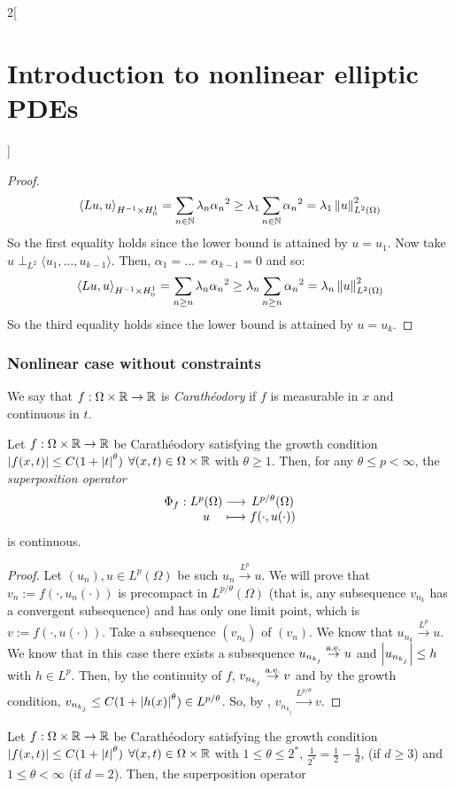 \documentclass[../../../main_math.tex]{subfiles}
\begin{document}
\begin{multicols}{2}[\section{Introduction to nonlinear elliptic PDEs}]
\begin{proof}
    $$
      {\langle Lu,u\rangle}_{H^{-1}\times H_0^1}= \sum_{n\in\mathbb{N}}\lambda_n{\alpha_n}^2\geq \lambda_1\sum_{n\in\mathbb{N}}{\alpha_n}^2=\lambda_1\left\|u\right\|_{L^2(\Omega)}^2
    $$
    So the first equality holds since the lower bound is attained by $u=u_1$. Now take $u\perp_{L^2}\langle u_1,\dots,u_{k-1}\rangle$. Then, $\alpha_1=\dots=\alpha_{k-1}=0$ and so:
    $$
      {\langle Lu,u\rangle}_{H^{-1}\times H_0^1}= \sum_{n\geq n}\lambda_n{\alpha_n}^2\geq \lambda_n\sum_{n\geq n}{\alpha_n}^2=\lambda_n\left\|u\right\|_{L^2(\Omega)}^2
    $$
    So the third equality holds since the lower bound is attained by $u=u_k$.
  \end{proof}
  \subsubsection{Nonlinear case without constraints}
  \begin{definition}
    We say that $f:\Omega\times \mathbb{R}\to\mathbb{R}$ is \emph{Carathéodory} if $f$ is measurable in $x$ and continuous in $t$.
  \end{definition}
  \begin{theorem}
    Let $f:\Omega\times \mathbb{R}\to\mathbb{R}$ be Carathéodory satisfying the growth condition $\abs{f(x,t)}\leq C(1+\abs{t}^\theta)$ $\forall (x,t)\in \Omega\times \mathbb{R}$ with $\theta\geq 1$. Then, for any $\theta\leq p<\infty$, the \emph{superposition operator}
    $$
      \function{\Phi_f}{L^p(\Omega)}{L^{p/\theta}(\Omega)}{u}{f(\cdot,u(\cdot))}
    $$
    is continuous.
  \end{theorem}
  \begin{proof}
    Let $(u_n),u\in L^p(\Omega)$ be such $u_n\overset{L^p}{\longrightarrow} u$. We will prove that $v_n:=f(\cdot,u_n(\cdot))$ is precompact in $L^{p/\theta}(\Omega)$ (that is, any subsequence $v_{n_k}$ has a convergent subsequence) and has only one limit point, which is $v:=f(\cdot,u(\cdot))$. Take a subsequence $(v_{n_k})$ of $(v_n)$. We know that $u_{n_k}\overset{L^p}{\longrightarrow} u$. We know that in this case there exists a subsequence $u_{n_{k_j}}\overset{\text{a.e.}}{\to }u$ and $\abs{u_{n_{k_j}}}\leq h$ with $h\in L^p$. Then, by the continuity of $f$, $v_{n_{k_j}}\overset{\text{a.e.}}{\to} v$ and by the growth condition, $v_{n_{k_j}}\leq C(1+\abs{h(x)}^\theta)\in L^{p/\theta}$. So, by , $v_{n_{k_j}}\overset{L^{p/\theta}}{\longrightarrow} v$.
  \end{proof}
  \begin{proposition}\label{INEPDE:minimization_prop1}
    Let $f:\Omega\times \mathbb{R}\to\mathbb{R}$ be Carathéodory satisfying the growth condition $\abs{f(x,t)}\leq C(1+\abs{t}^\theta)$ $\forall (x,t)\in \Omega\times \mathbb{R}$ with $1\leq \theta\leq 2^*$, $\frac{1}{2^*}=\frac{1}{2}-\frac{1}{d}$, (if $d\geq 3$) and $1\leq \theta<\infty$ (if $d=2$). Then, the superposition operator

\end{proposition}
\end{multicols}
\end{document}
